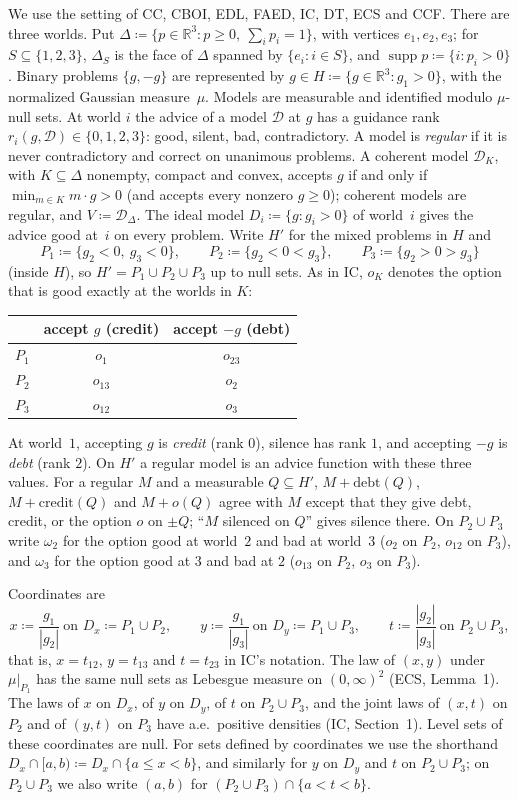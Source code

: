 \documentclass[11pt]{article}
\theoremstyle{definition}\newtheorem{definition}[theorem]{Definition}
\theoremstyle{remark}\newtheorem{remark}[theorem]{Remark}
\newcommand{\R}{\mathbb R}
\newcommand{\Dscr}{\mathcal D}
\newcommand{\supp}{\operatorname{supp}}
\newcommand{\debt}{\mathrm{debt}}
\newcommand{\cred}{\mathrm{credit}}
\begin{document}
We use the setting of CC, CBOI, EDL, FAED, IC, DT, ECS and CCF. There
are three worlds. Put $\Delta\coloneqq\{p\in\R^3:p\ge0,\
\sum_ip_i=1\}$, with vertices $e_1,e_2,e_3$; for $S\subseteq\{1,2,3\}$,
$\Delta_S$ is the face of $\Delta$ spanned by $\{e_i:i\in S\}$, and
$\supp p\coloneqq\{i:p_i>0\}$. Binary problems $\{g,-g\}$ are represented by
$g\in H\coloneqq\{g\in\R^3:g_1>0\}$, with the normalized Gaussian
measure~$\mu$. Models are measurable and identified modulo $\mu$-null sets.
At world $i$ the advice of a model $\Dscr$ at $g$ has a guidance rank
$r_i(g,\Dscr)\in\{0,1,2,3\}$: good, silent, bad, contradictory. A model is
\emph{regular} if it is never contradictory and correct on unanimous
problems. A coherent model $\Dscr_K$, with $K\subseteq\Delta$ nonempty,
compact and convex, accepts $g$ if and only if $\min_{m\in K}m\cdot g>0$
(and accepts every nonzero $g\ge0$); coherent models are regular, and
$V\coloneqq\Dscr_\Delta$. The ideal model $D_i\coloneqq\{g:g_i>0\}$ of
world~$i$ gives the advice good at~$i$ on every problem. Write $H'$ for the mixed problems in $H$ and
\[
 P_1\coloneqq\{g_2<0,\ g_3<0\},\qquad P_2\coloneqq\{g_2<0<g_3\},\qquad
 P_3\coloneqq\{g_2>0>g_3\}
\]
(inside $H$), so $H'=P_1\cup P_2\cup P_3$ up to null sets. As in IC, $o_K$
denotes the option that is good exactly at the worlds in $K$:
\begin{center}
\begin{tabular}{c|c|c}
 & accept $g$ (credit) & accept $-g$ (debt)\\\hline
$P_1$ & $o_1$ & $o_{23}$\\
$P_2$ & $o_{13}$ & $o_2$\\
$P_3$ & $o_{12}$ & $o_3$
\end{tabular}
\end{center}
At world~$1$, accepting $g$ is \emph{credit} (rank $0$), silence has rank
$1$, and accepting $-g$ is \emph{debt} (rank $2$). On $H'$ a regular model is
an advice function with these three values. For a regular $M$ and a
measurable $Q\subseteq H'$, $M+\debt(Q)$, $M+\cred(Q)$ and $M+o(Q)$ agree
with $M$ except that they give debt, credit, or the option $o$ on $\pm Q$;
``$M$ silenced on $Q$'' gives silence there. On $P_2\cup P_3$ write
$\omega_2$ for the option good at world~$2$ and bad at world~$3$ ($o_2$ on
$P_2$, $o_{12}$ on $P_3$), and $\omega_3$ for the option good at $3$ and bad
at $2$ ($o_{13}$ on $P_2$, $o_3$ on $P_3$).

Coordinates are
\[
 x\coloneqq\frac{g_1}{|g_2|}\ \text{on }D_x\coloneqq P_1\cup P_2,\qquad
 y\coloneqq\frac{g_1}{|g_3|}\ \text{on }D_y\coloneqq P_1\cup P_3,\qquad
 t\coloneqq\frac{|g_2|}{|g_3|}\ \text{on }P_2\cup P_3,
\]
that is, $x=t_{12}$, $y=t_{13}$ and $t=t_{23}$ in IC's notation. The law of
$(x,y)$ under $\mu|_{P_1}$ has the same null sets as Lebesgue measure on
$(0,\infty)^2$ (ECS, Lemma~1). The laws of $x$ on $D_x$, of $y$ on $D_y$, of
$t$ on $P_2\cup P_3$, and the joint laws of $(x,t)$ on $P_2$ and of $(y,t)$
on $P_3$ have a.e.\ positive densities (IC, Section~1). Level sets of these
coordinates are null. For sets defined by coordinates we use the shorthand
$D_x\cap[a,b)\coloneqq D_x\cap\{a\le x<b\}$, and similarly for $y$ on $D_y$
and $t$ on $P_2\cup P_3$; on $P_2\cup P_3$ we also write $(a,b)$ for
$(P_2\cup P_3)\cap\{a<t<b\}$.
\end{document}

